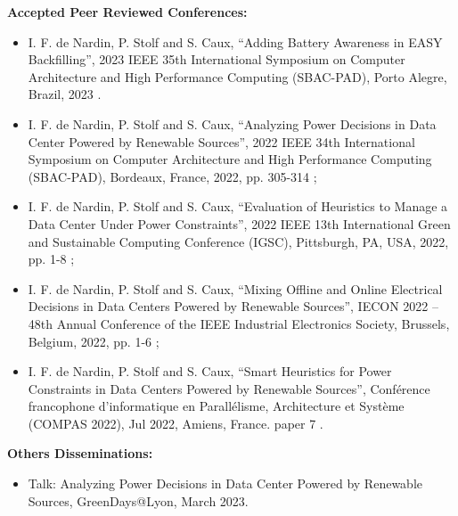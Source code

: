 \hspace{0.5cm} \textbf{Accepted Peer Reviewed Conferences:}
\begin{itemize}
    \item I. F. de Nardin, P. Stolf and S. Caux, ``Adding Battery Awareness in EASY Backfilling'', 2023 IEEE 35th International Symposium on Computer Architecture and High Performance Computing (SBAC-PAD), Porto Alegre, Brazil, 2023 \cite{de2023adding}.
    \item I. F. de Nardin, P. Stolf and S. Caux, ``Analyzing Power Decisions in Data Center Powered by Renewable Sources'', 2022 IEEE 34th International Symposium on Computer Architecture and High Performance Computing (SBAC-PAD), Bordeaux, France, 2022, pp. 305-314 \cite{de2022analyzing};
    \item I. F. de Nardin, P. Stolf and S. Caux, ``Evaluation of Heuristics to Manage a Data Center Under Power Constraints'', 2022 IEEE 13th International Green and Sustainable Computing Conference (IGSC), Pittsburgh, PA, USA, 2022, pp. 1-8 \cite{de2022evaluation};
    \item I. F. de Nardin, P. Stolf and S. Caux, ``Mixing Offline and Online Electrical Decisions in Data Centers Powered by Renewable Sources'', IECON 2022 – 48th Annual Conference of the IEEE Industrial Electronics Society, Brussels, Belgium, 2022, pp. 1-6 \cite{de2022mixing};
    \item  I. F. de Nardin, P. Stolf and S. Caux, ``Smart Heuristics for Power Constraints in Data Centers Powered by Renewable Sources'', Conférence francophone d'informatique en Parallélisme, Architecture et Système (COMPAS 2022), Jul 2022, Amiens, France. paper 7 \cite{fontanadenardin:hal-03757548}.
\end{itemize}

\textbf{Others Disseminations:}
\begin{itemize}
    \item Talk: Analyzing Power Decisions in Data Center
    Powered by Renewable Sources, GreenDays@Lyon, March 2023.
\end{itemize}

